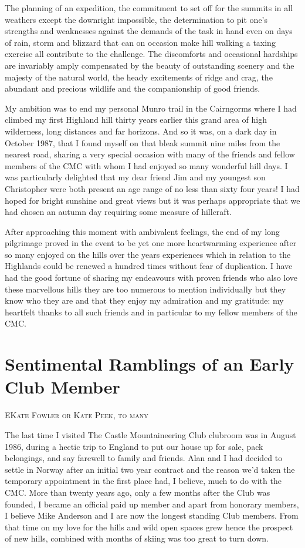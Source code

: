 \documentclass[a5paper,openany,font 10pt]{scrbook}
\makeatletter
\newcommand{\chapterauthor}[1]{%
{\parindent0pt\vspace*{-5pt}%
\linespread{1.1}\large\scshape#1%
\par\nobreak\vspace*{35pt}}
\@afterheading%
}
\makeatother
\begin{document}
The planning of an expedition, the commitment to set off for
the summits in all weathers except the downright impossible, the
determination to pit one's strengths  and weaknesses  against the
demands of the task in hand  even on days of rain, storm and
blizzard that can on occasion make hill walking a taxing
exercise  all contribute to the challenge. The discomforts and
occasional hardships are invariably amply compensated by the
beauty of outstanding scenery and the majesty of the natural
world, the heady excitements of ridge and crag, the abundant and
precious wildlife and the companionship of good friends.

My ambition was to end my personal Munro trail in the
Cairngorms where I had climbed my first Highland hill thirty
years earlier   this grand area of high wilderness, long
distances and far horizons. And so it was, on a dark day in
October 1987, that I found myself on that bleak summit nine miles
from the nearest road, sharing a very special occasion with many
of the friends and fellow members of the CMC with whom I had
enjoyed so many wonderful hill days. I was particularly delighted
that my dear friend Jim and my youngest son Christopher were both
present   an age range of no less than sixty four years! I had
hoped for bright sunshine and great views but it was perhaps
appropriate that we had chosen an autumn day requiring some
measure of hillcraft.

After approaching this moment with ambivalent feelings, the
end of my long pilgrimage proved in the event to be yet one more
heartwarming experience after so many enjoyed on the hills over
the years   experiences which in relation to the Highlands could
be renewed a hundred times without fear of duplication. I have
had the good fortune of sharing my endeavours with proven friends
who also love these marvellous hills  they are too numerous to
mention individually but they know who they are and that they
enjoy my admiration and my gratitude: my heartfelt thanks to all
such friends and in particular to my fellow members of the CMC.

\chapter{Sentimental Ramblings of an Early Club Member}
\label{sec:org9e5b62b}
\chapterauthor{EKate Fowler or Kate Peek, to many}

The last time I visited The Castle Mountaineering Club
clubroom was in August 1986, during a hectic trip to England to
put our house up for sale, pack belongings, and say farewell to
family and friends. Alan and I had decided to settle in Norway
after an initial two year contract and the reason we'd taken the
temporary appointment in the first place had, I believe, much to
do with the CMC. More than twenty years ago, only a few months
after the Club was founded, I became an official paid up member
and apart from honorary members, I believe Mike Anderson and I
are now the longest standing Club members. From that time on my
love for the hills and wild open spaces grew  hence the prospect
of new hills, combined with months of skiing was too great to
turn down.
\end{document}
